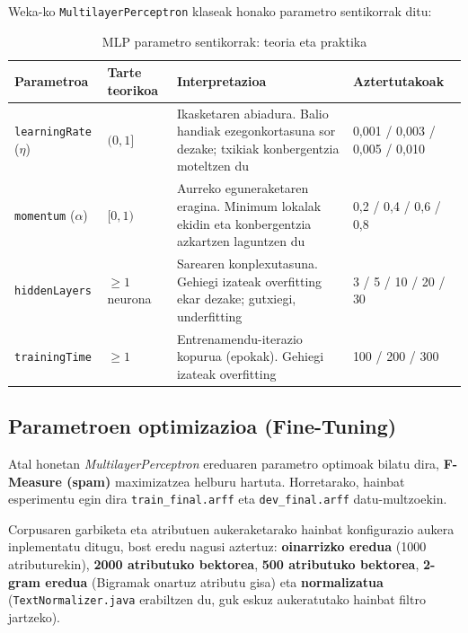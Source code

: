 \documentclass[12pt, a4paper]{article}
\begin{document}
Weka-ko \texttt{MultilayerPerceptron} klaseak honako parametro sentikorrak ditu:

\begin{table}[H]
    \centering
    \caption{MLP parametro sentikorrak: teoria eta praktika}
    \begin{tabular}{p{2.5cm}p{2.2cm}p{4cm}p{3cm}}
        \toprule
        \textbf{Parametroa} & \textbf{Tarte teorikoa} & \textbf{Interpretazioa} &
        \textbf{Aztertutakoak} \\
        \midrule
        \texttt{learningRate} ($\eta$) & $(0, 1]$ &
        Ikasketaren abiadura. Balio handiak ezegonkortasuna sor dezake;
        txikiak konbergentzia moteltzen du &
        0,001 / 0,003 / 0,005 / 0,010 \\
        \midrule
        \texttt{momentum} ($\alpha$) & $[0, 1)$ &
        Aurreko eguneraketaren eragina. Minimum lokalak ekidin eta
        konbergentzia azkartzen laguntzen du &
        0,2 / 0,4 / 0,6 / 0,8 \\
        \midrule
        \texttt{hiddenLayers} & $\geq 1$ neurona &
        Sarearen konplexutasuna. Gehiegi izateak overfitting ekar dezake;
        gutxiegi, underfitting &
        3 / 5 / 10 / 20 / 30 \\
        \midrule
        \texttt{trainingTime} & $\geq 1$ &
        Entrenamendu-iterazio kopurua (epokak). Gehiegi izateak overfitting &
        100 / 200 / 300 \\
        \bottomrule
    \end{tabular}
    \label{tab:parametroak}
\end{table}

\subsection{Parametroen optimizazioa (Fine-Tuning)}

Atal honetan \textit{MultilayerPerceptron} ereduaren parametro optimoak bilatu dira, \textbf{F-Measure (spam)} maximizatzea helburu hartuta. Horretarako, hainbat esperimentu egin dira \texttt{train\_final.arff} eta \texttt{dev\_final.arff} datu-multzoekin.

Corpusaren garbiketa eta atributuen aukeraketarako hainbat konfigurazio aukera inplementatu ditugu, bost eredu nagusi aztertuz: \textbf{oinarrizko eredua} (1000 atributurekin), \textbf{2000 atributuko bektorea}, \textbf{500 atributuko bektorea}, \textbf{2-gram eredua} (Bigramak onartuz atributu gisa) eta \textbf{normalizatua} (\texttt{TextNormalizer.java} erabiltzen du, guk eskuz aukeratutako hainbat filtro jartzeko).
\end{document}
